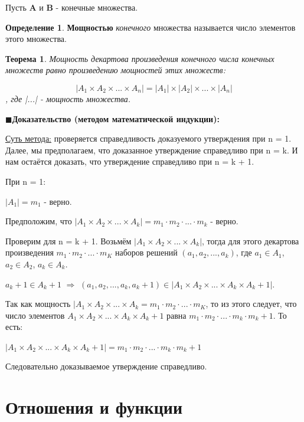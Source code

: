 \documentclass[12pt, a4paper, oneside]{article}
\theoremstyle{plain} %
\newtheorem{theorem}{Теорема}[section]
\theoremstyle{definition}
\newtheorem*{definition}{Определение}  %
\newcommand{\indef}[1]{\textbf{ \color{dark_red} #1}}
\begin{document}
Пусть \textbf{A} и \textbf{B} - конечные множества.

\begin{definition}
\indef{Мощностью} \emph{конечного} множества называется число элементов этого множества. 
\end{definition}

\begin{theorem}
Мощность декартова произведения конечного числа конечных множеств равно произведению мощностей этих множеств:

\[|A_1 \times A_2 \times ... \times  A_n| = |A_1| \times |A_2| \times ... \times |A_n|\], где |...| - мощность множества.
\end{theorem}

\(\blacksquare\)\textbf{Доказательство (методом математической индукции):}


\underline{Суть метода:} проверяется справедливость доказуемого  утверждения при n = 1. Далее, мы предполагаем, что доказанное утверждение справедливо при n = k. И нам остаётся доказать, что утверждение справедливо при n = k + 1. 


При n = 1: 


\(|A_1| = m_1\) - верно. 


Предположим, что \(|A_1 \times A_2 \times ... \times A_k| = m_1 \cdot m_2 \cdot... \cdot m_k\) - верно. 


Проверим для n = k + 1. Возьмём \(|A_1 \times A_2 \times ... \times A_k|\), тогда для этого декартова произведения \(m_1 \cdot m_2 \cdot ... \cdot m_K\) наборов решений \((a_1, a_2, ... , a_k)\), где $a_1 \in A_1$, $a_2 \in A_2$, $a_k \in A_k$. 


$a_k+1 \in A_k+1$ $\Longrightarrow$ \((a_1, a_2, ... , a_k, a_k+1) \in |A_1 \times A_2 \times ... \times A_k \times A_k+1|\). 


Так как мощность $|A_1 \times A_2 \times ... \times A_k = m_1 \cdot m_2 \cdot... \cdot m_K$, то из этого следует, что число элементов 
$A_1 \times A_2 \times ... \times A_k \times A_k+1$ равна $m_1 \cdot m_2 \cdot... \cdot m_k \cdot m_k+1$. То есть:


$|A_1 \times A_2 \times ... \times A_k \times A_k+1| = m_1 \cdot m_2 \cdot... \cdot m_k \cdot m_k+1 $ 

 
Следовательно доказываемое утверждение справедливо.

\section*{Отношения и функции}
\end{document}

